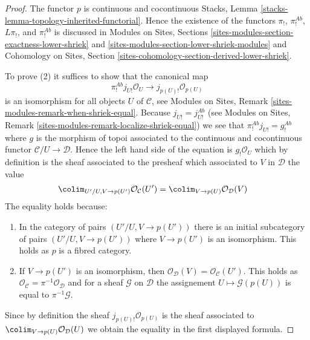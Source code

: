 \begin{proof}
The functor $p$ is continuous and cocontinuous
Stacks, Lemma \ref{stacks-lemma-topology-inherited-functorial}.
Hence the existence of the functors $\pi_!$, $\pi_!^{\textit{Ab}}$,
$L\pi_!$, and $\pi_!^{\textit{Ab}}$ is discussed in
Modules on Sites, Sections
\ref{sites-modules-section-exactness-lower-shriek} and
\ref{sites-modules-section-lower-shriek-modules}
and
Cohomology on Sites, Section
\ref{sites-cohomology-section-derived-lower-shriek}.

\medskip\noindent
To prove (2) it suffices to show that the canonical map
$$
\pi_!^{\textit{Ab}}j_{U!}\mathcal{O}_U \to j_{p(U)!}\mathcal{O}_{p(U)}
$$
is an isomorphism for all objects $U$ of $\mathcal{C}$, see
Modules on Sites, Remark \ref{sites-modules-remark-when-shriek-equal}.
Because $j_{U!} = j_{U!}^{\textit{Ab}}$ (see
Modules on Sites, Remark \ref{sites-modules-remark-localize-shriek-equal})
we see that $\pi_!^{\textit{Ab}}j_{U!} = g_!^{\textit{Ab}}$ where
$g$ is the morphism of topoi associated to the continuous and
cocontinuous functor $\mathcal{C}/U \to \mathcal{D}$.
Hence the left hand side of the equation is $g_!\mathcal{O}_U$
which by definition is the sheaf associated to the presheaf
which associated to $V$ in $\mathcal{D}$ the value
\begin{align*}
\colim_{U'/U, V \to p(U')} \mathcal{O}_\mathcal{C}(U')
& =
\colim_{V \to p(U)} \mathcal{O}_\mathcal{D}(V)
\end{align*}
The equality holds because:
\begin{enumerate}
\item In the category of pairs $(U'/U, V \to p(U'))$ there is an
initial subcategory of pairs $(U'/U, V \to p(U'))$ where $V \to p(U')$
is an isomorphism. This holds as $p$ is a fibred category.
\item If $V \to p(U')$ is an isomorphism, then
$\mathcal{O}_\mathcal{D}(V) = \mathcal{O}_\mathcal{C}(U')$.
This holds as $\mathcal{O}_\mathcal{C} = \pi^{-1}\mathcal{O}_\mathcal{D}$
and for a sheaf $\mathcal{G}$ on $\mathcal{D}$ the assignement
$U \mapsto \mathcal{G}(p(U))$ is equal to $\pi^{-1}\mathcal{G}$.
\end{enumerate}
Since by definition the sheaf $j_{p(U)!}\mathcal{O}_{p(U)}$ is the sheaf
associated to $\colim_{V \to p(U)} \mathcal{O}_\mathcal{D}(U)$ we obtain the
equality in the first displayed formula.


\end{proof}
